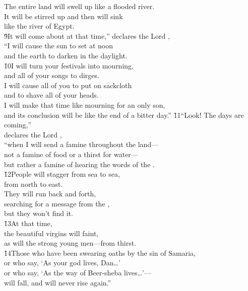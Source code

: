 \begin{poetry}
\poeml The entire land will swell up like a flooded river. \\
\poemll    It will be stirred up and then will sink \\
\poemlll       like the river of Egypt. \\
\poeml \v{9}It will come about at that time,'' declares the Lord , \\
\poemll    ``I will cause the sun to set at noon \\
\poemlll       and the earth to darken in the daylight. \\
\poeml \v{10}I will turn your festivals into mourning, \\
\poemll    and all of your songs to dirges. \\
\poeml I will cause all of you to put on sackcloth \\
\poemll    and to shave all of your heads. \\
\poeml I will make that time like mourning for an only son, \\
\poemll    and its conclusion will be like the end of a bitter day.''
\poeml \v{11}``Look! The days are coming,'' \\
\poemll    declares the Lord , \\
\poeml ``when I will send a famine throughout the land--- \\
\poemll    not a famine of food or a thirst for water--- \\
\poemlll       but rather a famine of hearing the words of the . \\
\poeml \v{12}People will stagger from sea to sea, \\
\poemll    from north to east. \\
\poeml They will run back and forth, \\
\poemll    searching for a message from the , \\
\poemlll       but they won't find it. \\
\poeml \v{13}At that time, \\
\poemll    the beautiful virgins will faint, \\
\poemlll       as will the strong young men---from thirst. \\
\poeml \v{14}Those who have been swearing oaths by the sin of Samaria, \\
\poemll    or who say, `As your god lives, Dan{\ldots}' \\
\poeml or who say, `As the way of Beer-sheba lives{\ldots}'--- \\
\poemll    will fall, and will never rise again.''
\end{poetry}

